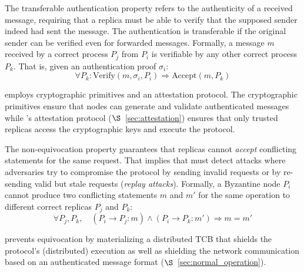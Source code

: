  The transferable authentication property refers to the authenticity of a received message, requiring that a replica must be able to verify that the supposed sender indeed had sent the message. The authentication is transferable if the original sender can be verified even for forwarded messages. Formally, a message $m$ received by a correct process $P_j$ from $P_i$ is verifiable by any other correct process $P_k$. That is, given an authentication proof $\sigma_i$: 
\[
\forall P_k : \text{Verify}(m, \sigma_i, P_i) \Rightarrow \text{Accept}(m, P_k)
\]

 \projecttitle{} employs cryptographic primitives and an attestation protocol. The cryptographic primitives ensure that nodes can generate and validate authenticated messages while \projecttitle{}'s attestation protocol ($\S$~\ref{sec:attestation}) ensures that only trusted replicas access the cryptographic keys and execute the protocol.

 The non-equivocation property guarantees that replicas cannot \emph{accept} conflicting statements for the same request. That implies that \projecttitle{} must detect attacks where adversaries try to compromise the protocol by sending invalid requests or by re-sending valid but stale requests (\emph{replay attacks}). Formally, a Byzantine node $P_i$ cannot produce two conflicting statements $m$ and $m'$ for the same operation to different correct replicas $P_j$ and $P_k$: \[
\forall P_j, P_k, \quad (P_i \xrightarrow{} P_j : m) \wedge (P_i \xrightarrow{} P_k : m') \Rightarrow m = m'
\]

 \projecttitle{} prevents equivocation by materializing a distributed TCB that shields the protocol's (distributed) execution as well as shielding the network communication based on an authenticated message format ($\S$~\ref{sec:normal_operation}). 
